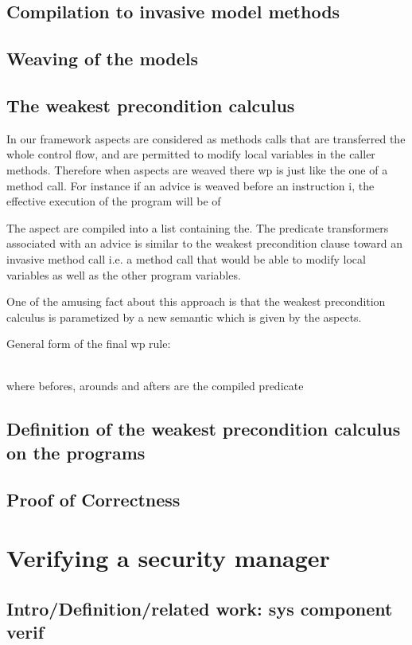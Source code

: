 \documentclass[draft]{llncs}
\begin{document}
\subsection{Compilation to invasive model methods}

\subsection{Weaving of the models}


\subsection{The weakest precondition calculus}

In our framework aspects are considered as methods calls that are
transferred the whole control flow, and are permitted to modify local
variables in the caller methods. Therefore when aspects are weaved
there wp is just like the one of a method call.  For instance if an
advice is weaved before an instruction i, the effective execution of
the program will be of

The aspect are compiled into a list containing the.  The predicate
transformers associated with an advice is similar to the weakest
precondition clause toward an invasive method call i.e. a method call
that would be able to modify local variables as well as the other
program variables.

One of the amusing fact about this approach is that the weakest
precondition calculus is parametized by a new semantic which is given
by the aspects.

General form of the final wp rule:
\bcode

\\
\ecode
where befores, arounds and afters are the compiled predicate
\subsection{Definition of the weakest precondition calculus on the programs}
\subsection{Proof of Correctness}
%
\section{Verifying a security manager}
\subsection{Intro/Definition/related work: sys component verif}
\end{document}

